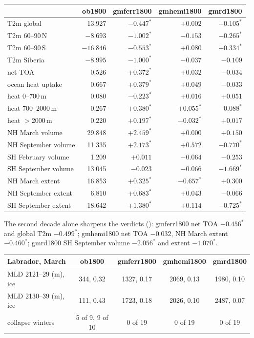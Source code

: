 \documentclass[10pt]{article}
\begin{document}
\begin{center}\small
\begin{tabular}{lrrrr}
\toprule
 & ob1800 & gmferr1800 & \textbf{gmhemi1800} & gmrd1800 \\
\midrule
T2m global              & 13.927    & $-0.447^*$ & $+0.002$ & $+0.105^*$ \\
T2m 60--90\,N           & $-8.693$  & $-1.002^*$ & $-0.153$ & $-0.265^*$ \\
T2m 60--90\,S           & $-16.846$ & $-0.553^*$ & $+0.080$ & $+0.334^*$ \\
T2m Siberia             & $-8.995$  & $-1.000^*$ & $-0.037$ & $-0.109$ \\
net TOA                 & 0.526     & $+0.372^*$ & $+0.032$ & $-0.034$ \\
ocean heat uptake       & 0.667     & $+0.379^*$ & $+0.049$ & $-0.033$ \\
heat 0--700\,m          & 0.080     & $-0.223^*$ & $+0.016$ & $+0.051$ \\
heat 700--2000\,m       & 0.267     & $+0.380^*$ & $+0.055^*$ & $-0.088^*$ \\
heat $>$2000\,m         & 0.220     & $+0.197^*$ & $-0.032^*$ & $+0.017$ \\
NH March volume         & 29.848    & $+2.459^*$ & $+0.000$ & $+0.150$ \\
NH September volume     & 11.335    & $+2.173^*$ & $+0.572$ & $-0.770^*$ \\
SH February volume      & 1.209     & $+0.011$   & $-0.064$ & $-0.253$ \\
SH September volume     & 13.045    & $-0.023$   & $-0.066$ & $-1.669^*$ \\
NH March extent         & 16.853    & $+0.325^*$ & $-0.657^*$ & $+0.300$ \\
NH September extent     & 6.810     & $+0.683^*$ & $+0.043$ & $-0.066$ \\
SH September extent     & 18.642    & $+1.380^*$ & $+0.114$ & $-0.725^*$ \\
\bottomrule
\end{tabular}
\end{center}

The second decade alone sharpens the verdicts ():
gmferr1800 net TOA $+0.456^*$ and global T2m $-0.499^*$; gmhemi1800 net TOA $-0.032$, NH March
extent $-0.460^*$; gmrd1800 SH September volume $-2.056^*$ and extent $-1.070^*$.

\begin{center}\small
\begin{tabular}{lcccc}
\toprule
Labrador, March & ob1800 & gmferr1800 & gmhemi1800 & gmrd1800 \\
\midrule
MLD 2121--29 (m), ice & 344, 0.32 & 1327, 0.17 & 2069, 0.13 & 1980, 0.10 \\
MLD 2130--39 (m), ice & 111, 0.43 & 1723, 0.18 & 2026, 0.10 & 2487, 0.07 \\
collapse winters      & 5 of 9, 9 of 10 & 0 of 19 & 0 of 19 & 0 of 19 \\
\bottomrule
\end{tabular}
\end{center}
\end{document}
